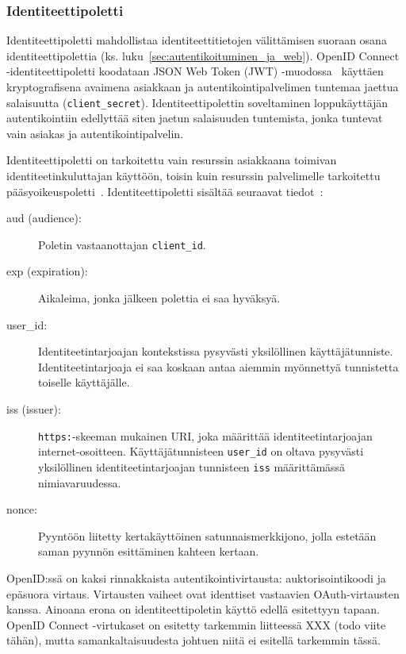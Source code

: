 \documentclass[finnish,gradu]{tktltiki}
\begin{document}

  \subsubsection{Identiteettipoletti} %
  \label{ssub:identiteettipoletti}

  Identiteettipoletti mahdollistaa identiteettitietojen välittämisen suoraan osana identiteettipolettia (ks. luku~\ref{sec:autentikoituminen_ja_web}). OpenID Connect -identiteettipoletti koodataan JSON Web Token (JWT) -muodossa~\cite{json_web_token_2011} käyttäen kryptografisena avaimena asiakkaan ja autentikointipalvelimen tuntemaa jaettua salaisuutta (\verb!client_secret!). Identiteettipolettin soveltaminen loppukäyttäjän autentikointiin edellyttää siten jaetun salaisuuden tuntemista, jonka tuntevat vain asiakas ja autentikointipalvelin.

  Identiteettipoletti on tarkoitettu vain resurssin asiakkaana toimivan identiteetinkuluttajan käyttöön, toisin kuin resurssin palvelimelle tarkoitettu pääsyoikeuspoletti~\cite{bradley_oauth_authentication_problem_2012}. Identiteettipoletti sisältää seuraavat tiedot~\cite{sakimura_openid_c_nutshell_2012}:

  \begin{description}
    \item[aud (audience):] Poletin vastaanottajan \verb!client_id!.

    \item[exp (expiration):] Aikaleima, jonka jälkeen polettia ei saa hyväksyä.

    \item[user\_id:] Identiteetintarjoajan kontekstissa pysyvästi yksilöllinen käyttäjätunniste. Identiteetintarjoaja ei saa koskaan antaa aiemmin myönnettyä tunnistetta toiselle käyttäjälle.

    \item[iss (issuer):] \verb!https:!-skeeman mukainen URI, joka määrittää identiteetintarjoajan internet-osoitteen. Käyttäjätunnisteen \verb!user_id! on oltava pysyvästi yksilöllinen identiteetintarjoajan tunnisteen \verb!iss! määrittämässä nimiavaruudessa.

    \item[nonce:] Pyyntöön liitetty kertakäyttöinen satunnaismerkkijono, jolla estetään saman pyynnön esittäminen kahteen kertaan.
  \end{description}

  OpenID:ssä on kaksi rinnakkaista autentikointivirtausta: auktorisointikoodi ja epäsuora virtaus. Virtausten vaiheet ovat identtiset vastaavien OAuth-virtausten kanssa. Ainoana erona on identiteettipoletin käyttö edellä esitettyyn tapaan. OpenID Connect -virtukaset on esitetty tarkemmin liitteessä XXX (todo viite tähän), mutta samankaltaisuudesta johtuen niitä ei esitellä tarkemmin tässä.
\end{document}
